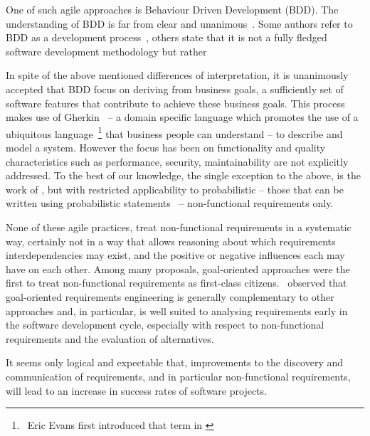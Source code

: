 \documentclass[dissertation,final]{softeng}
\begin{document}
{One of such agile approaches is Behaviour Driven Development (BDD). The understanding of BDD is far from clear and unanimous~\citep{Solis0}. Some authors refer to BDD as a development process~\citep{Smart201410}, others state that it is not a fully fledged software development methodology but rather \emph{}

In spite of the above mentioned differences of interpretation, it is unanimously accepted that BDD focus on deriving from  business goals, a sufficiently set of software features that contribute to achieve these business goals. This process makes use of Gherkin~\citep{wynne2012cucumber} -- a domain specific language which promotes the use of a ubiquitous language~\footnote{~Eric Evans first introduced that term in  \citet{evans2004domain}}  that business people can understand -- to describe and model a system. However the focus has been on functionality and quality characteristics such as performance, security, maintainability are not explicitly addressed. To the best of our knowledge, the single exception to the above, is the work of \citet{barmi2011automated}, but with restricted applicability to probabilistic -- those that can be written using probabilistic statements~\citep{grunske2008specification} -- non-functional requirements only.

None of these agile practices, treat non-functional requirements in a systematic way, certainly not in a way that allows reasoning about which requirements interdependencies may exist, and the positive or negative influences each may have on each other. Among many proposals, goal-oriented approaches were the first to treat non-functional requirements as first-class citizens.~\citet{Mylopoulos:1999jh} observed that goal-oriented requirements engineering is generally complementary to other approaches and, in particular, is well suited to analysing requirements early in the software development cycle, especially with respect to non-functional requirements and the evaluation of alternatives. 

It seems only logical and expectable that, improvements to the discovery and communication of requirements, and in particular non-functional requirements, will lead to an increase in success rates of software projects.

}
\end{document}
